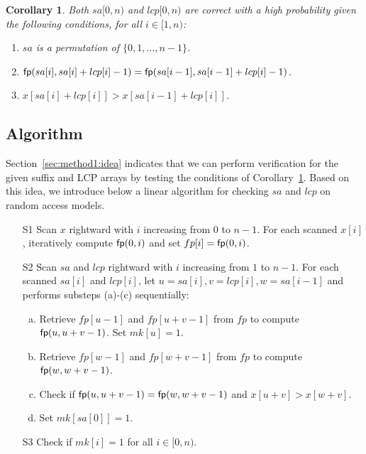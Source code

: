 \documentclass[10pt,journal,compsoc]{IEEEtran}
\newtheorem{Corollary}{Corollary}
\begin{document}
\begin{Corollary} \label{corollary:1}
	Both $sa[0, n)$ and $lcp[0, n)$ are correct with a high probability given the following conditions, for all $i \in [1, n)$:
	
	\begin{enumerate}[(1)]
		\item
		$sa$ is a permutation of $\{0, 1, \dots, n - 1\}$.
		
		\item
		${\sf fp}(sa[i], sa[i] + lcp[i] - 1) = {\sf fp}(sa[i - 1], sa[i - 1] + lcp[i] - 1)$.
		
		\item
		$x[sa[i] + lcp[i]] > x[sa[i - 1] + lcp[i]]$.
	\end{enumerate}
\end{Corollary}


\subsection{Algorithm} \label{sec:method1:algorithm}

Section~\ref{sec:method1:idea} indicates that we can perform verification for the given suffix and LCP arrays by testing the conditions of Corollary~\ref{corollary:1}. Based on this idea, we introduce below a linear algorithm for checking $sa$ and $lcp$ on random access models.

\begin{enumerate}
	\item [S1]
	Scan $x$ rightward with $i$ increasing from $0$ to $n - 1$. For each scanned $x[i]$, iteratively compute ${\sf fp}(0, i)$ and set $fp[i] = {\sf fp}(0, i)$.
	
	\item [S2]
	Scan $sa$ and $lcp$ rightward with $i$ increasing from $1$ to $n - 1$. For each scanned $sa[i]$ and $lcp[i]$, let $u = sa[i], v = lcp[i], w = sa[i - 1]$ and performs substeps (a)-(c) sequentially:
	
	\begin{enumerate}[(a)]
		\item 
		Retrieve $fp[u - 1]$ and $fp[u + v - 1]$ from $fp$ to compute ${\sf fp}(u, u + v - 1)$. Set $mk[u] = 1$.
		
		\item 
		Retrieve $fp[w - 1]$ and $fp[w + v - 1]$ from $fp$ to compute ${\sf fp}(w, w + v - 1)$. 
		
		\item 
		Check if ${\sf fp}(u, u + v - 1) = {\sf fp}(w, w + v - 1)$ and $x[u + v] > x[w + v]$.
		
		\item 
		Set $mk[sa[0]] = 1$. 
	\end{enumerate}

	\item [S3] Check if $mk[i] = 1$ for all $i \in [0, n)$.
	
\end{enumerate}
\end{document}
